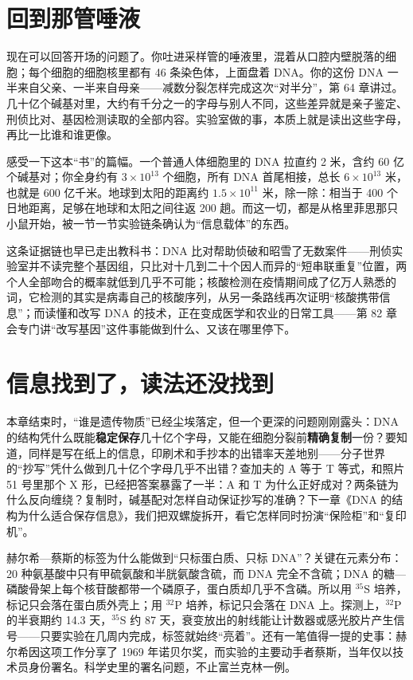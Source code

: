 \section{回到那管唾液}

现在可以回答开场的问题了。你吐进采样管的唾液里，混着从口腔内壁脱落的细胞；每个细胞的细胞核里都有 46 条染色体，上面盘着 DNA。你的这份 DNA 一半来自父亲、一半来自母亲——减数分裂怎样完成这次“对半分”，第 64 章讲过。几十亿个碱基对里，大约有千分之一的字母与别人不同，这些差异就是亲子鉴定、刑侦比对、基因检测读取的全部内容。实验室做的事，本质上就是读出这些字母，再比一比谁和谁更像。

感受一下这本“书”的篇幅。一个普通人体细胞里的 DNA 拉直约 2 米，含约 60 亿个碱基对；你全身约有 $3\times 10^{13}$ 个细胞，所有 DNA 首尾相接，总长 $6\times 10^{13}$ 米，也就是 600 亿千米。地球到太阳的距离约 $1.5\times 10^{11}$ 米，除一除：相当于 400 个日地距离，足够在地球和太阳之间往返 200 趟。而这一切，都是从格里菲思那只小鼠开始，被一节一节实验链条确认为“信息载体”的东西。

这条证据链也早已走出教科书：DNA 比对帮助侦破和昭雪了无数案件——刑侦实验室并不读完整个基因组，只比对十几到二十个因人而异的“短串联重复”位置，两个人全部吻合的概率就低到几乎不可能；核酸检测在疫情期间成了亿万人熟悉的词，它检测的其实是病毒自己的核酸序列，从另一条路线再次证明“核酸携带信息”；而读懂和改写 DNA 的技术，正在变成医学和农业的日常工具——第 82 章会专门讲“改写基因”这件事能做到什么、又该在哪里停下。

\section{信息找到了，读法还没找到}

本章结束时，“谁是遗传物质”已经尘埃落定，但一个更深的问题刚刚露头：DNA 的结构凭什么既能\textbf{稳定保存}几十亿个字母，又能在细胞分裂前\textbf{精确复制}一份？要知道，同样是写在纸上的信息，印刷术和手抄本的出错率天差地别——分子世界的“抄写”凭什么做到几十亿个字母几乎不出错？查加夫的 A 等于 T 等式，和照片 51 号里那个 X 形，已经把答案暴露了一半：A 和 T 为什么正好成对？两条链为什么反向缠绕？复制时，碱基配对怎样自动保证抄写的准确？下一章《DNA 的结构为什么适合保存信息》，我们把双螺旋拆开，看它怎样同时扮演“保险柜”和“复印机”。

\begin{tiaozhan}
赫尔希—蔡斯的标签为什么能做到“只标蛋白质、只标 DNA”？关键在元素分布：20 种氨基酸中只有甲硫氨酸和半胱氨酸含硫，而 DNA 完全不含硫；DNA 的糖—磷酸骨架上每个核苷酸都带一个磷原子，蛋白质却几乎不含磷。所以用 $^{35}\mathrm{S}$ 培养，标记只会落在蛋白质外壳上；用 $^{32}\mathrm{P}$ 培养，标记只会落在 DNA 上。探测上，$^{32}\mathrm{P}$ 的半衰期约 14.3 天，$^{35}\mathrm{S}$ 约 87 天，衰变放出的射线能让计数器或感光胶片产生信号——只要实验在几周内完成，标签就始终“亮着”。还有一笔值得一提的史事：赫尔希因这项工作分享了 1969 年诺贝尔奖，而实验的主要动手者蔡斯，当年仅以技术员身份署名。科学史里的署名问题，不止富兰克林一例。
\end{tiaozhan}

